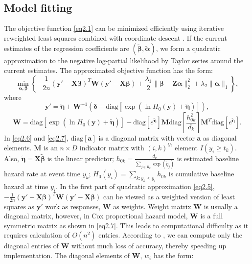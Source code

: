 \subsection{Model fitting}
The objective function \eqref{eq2.1} can be minimized efficiently using iterative reweighted least squares combined with coordinate descent \citep{simon2011regularization}. If the current estimates of the regression coefficients are $(\tilde{\bm{\beta}}, \tilde{\bm{\alpha}})$, we form a quadratic approximation to the negative log-partial likelihood by Taylor series around the current estimates. The approximated objective function has the form:
\begin{equation}
    \min_{\bm{\alpha},\bm{\beta}} \left\{ -\frac{1}{2n}(\bm{y}'-\bm{X\beta})^T\bm{W}(\bm{y}'-\bm{X\beta})+\frac{\lambda_1}{2}\|\bm{\beta}-\bm{Z\alpha}\|_2^2+\lambda_2\|\bm{\alpha}\|_1 \right\}, \label{eq2.5}
\end{equation}
where 
\begin{equation}
    \bm{y}'=\tilde{\bm{\eta}}+\bm{W}^{-1}(\bm{\delta}-\text{diag}[\exp{(\ln{H_0(\bm{y})}+\tilde{\bm{\eta}})}]), \label{eq2.6} 
\end{equation}
\begin{equation}
    \bm{W}=\text{diag}\left[\exp{(\ln{H_0(\bm{y})}+\tilde{\bm{\eta}})}\right] - \text{diag} [e^{\tilde{\bm{\eta}}}]\bm{M}\text{diag}\left[\frac{h_{0k}^2}{d_k}\right]\bm{M}^T\text{diag}[e^{\tilde{\bm{\eta}}}]. \label{eq2.7}
\end{equation}
In \eqref{eq2.6} and \eqref{eq2.7}, $\text{diag}[\bm{a}]$ is a diagonal matrix with vector $\bm{a}$ as diagonal elements. $\bm{M}$ is an $n\times D$ indicator matrix with $(i,k)^{th}$ element $I(y_i\geq t_k)$. Also, $\tilde{\bm{\eta}}=\bm{X}\tilde{\bm{\beta}}$ is the linear predictor; $h_{0k}=\frac{d_k}{\sum_{j\in R_k}\exp{(\tilde{\eta}_j)}}$ is estimated baseline hazard rate at event time $y_k$; $H_0(y_i)=\sum_{k:y_k\leq y_i}h_{0k}$ is cumulative baseline hazard at time $y_i$. In the first part of quadratic approximation \eqref{eq2.5}, $-\frac{1}{2n}(\bm{y}'-\bm{X\beta})^T\bm{W}(\bm{y}'-\bm{X\beta})$ can be viewed as a weighted version of least squares as $\bm{y}'$ work as responses, $\bm{W}$ as weights. Weight matrix $\bm{W}$ is usually a diagonal matrix, however, in Cox proportional hazard model, $\bm{W}$ is a full symmetric matrix as shown in \eqref{eq2.7}. This leads to computational difficulty as it requires calculation of $O(n^2)$ entries. According to \cite{simon2011regularization}, we can compute only the diagonal entries of $\bm{W}$ without much loss of accuracy, thereby speeding up implementation. The diagonal elements of $\bm{W}$, $w_i$ has the form:
